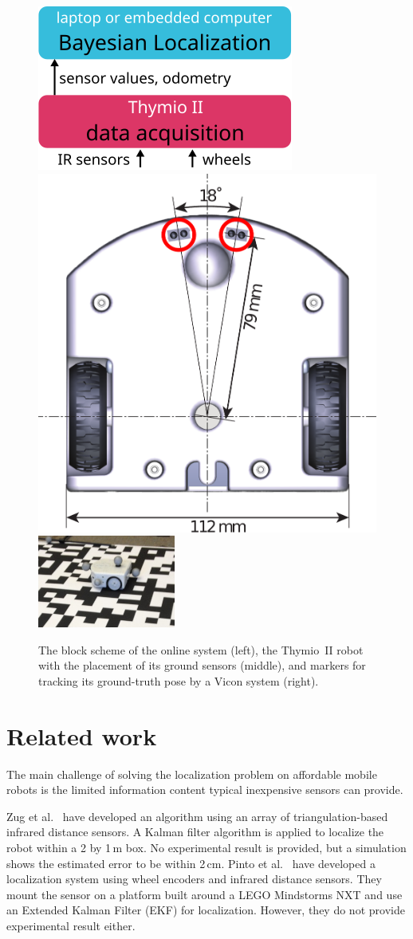 \documentclass{svmult}
\begin{document}
\begin{figure}
\includegraphics{system-bloc-scheme}\hfill
\includegraphics[height=.24\columnwidth]{thymio2-dimensions}\hfill
\includegraphics[height=.23\columnwidth]{thymio2-dataset}
\vspace{-.07cm}
\caption{The block scheme of the online system (left), the Thymio~II robot with the placement of its ground sensors (middle), and markers for tracking its ground-truth pose by a Vicon system (right).}
\label{fig:thymio}
\end{figure}

\section{Related work}

The main challenge of solving the localization problem on affordable mobile robots is the limited information content typical inexpensive sensors can provide.

Zug et al.~\cite{zug2011design} have developed an algorithm using an array of triangulation-based infrared distance sensors.
A Kalman filter algorithm is applied to localize the robot within a 2 by 1\,m box.
No experimental result is provided, but a simulation shows the estimated error to be within 2\,cm.
Pinto et al.~\cite{pinto2012localization} have developed a localization system using wheel encoders and infrared distance sensors.
They mount the sensor on a platform built around a LEGO Mindstorms NXT and use an Extended Kalman Filter (EKF) for localization.
However, they do not provide experimental result either.
\end{document}
